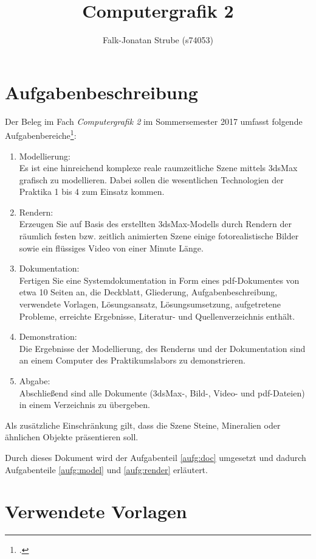 \documentclass{scrreprt}
\title{Computergrafik 2}
\author{Falk-Jonatan Strube (s74053)}
\begin{document}
\maketitle
\tableofcontents

\chapter{Aufgabenbeschreibung}

Der Beleg im Fach \emph{Computergrafik 2} im Sommersemester 2017 umfasst folgende Aufgabenbereiche\footcite{Oertel2017}:
\begin{enumerate}
\item Modellierung:\label{aufg:model}\\
Es ist eine hinreichend komplexe reale raumzeitliche Szene mittels 3dsMax grafisch zu modellieren. Dabei sollen die wesentlichen Technologien der Praktika 1 bis 4 zum Einsatz kommen.
\item Rendern:\label{aufg:render}\\
Erzeugen Sie auf Basis des erstellten 3dsMax-Modells durch Rendern der räumlich festen bzw. zeitlich animierten Szene einige fotorealistische Bilder sowie ein flüssiges Video von einer Minute Länge.
\item Dokumentation:\label{aufg:doc}\\
Fertigen Sie eine Systemdokumentation in Form eines pdf-Dokumentes von etwa 10 Seiten an, die Deckblatt, Gliederung, Aufgabenbeschreibung, verwendete Vorlagen, Lösungsansatz, Lösungsumsetzung, aufgetretene Probleme, erreichte Ergebnisse, Literatur- und Quellenverzeichnis enthält.
\item Demonstration:\\
Die Ergebnisse der Modellierung, des Renderns und der Dokumentation sind an einem Computer des Praktikumslabors zu demonstrieren.
\item Abgabe:\\
Abschließend sind alle Dokumente (3dsMax-, Bild-, Video- und pdf-Dateien) in einem Verzeichnis zu übergeben.
\end{enumerate}

Als zusätzliche Einschränkung gilt, dass die Szene Steine, Mineralien oder ähnlichen Objekte präsentieren soll.\bigskip

Durch dieses Dokument wird der Aufgabenteil \ref{aufg:doc} umgesetzt und dadurch Aufgabenteile \ref{aufg:model} und \ref{aufg:render} erläutert.


\chapter{Verwendete Vorlagen}
\end{document}
